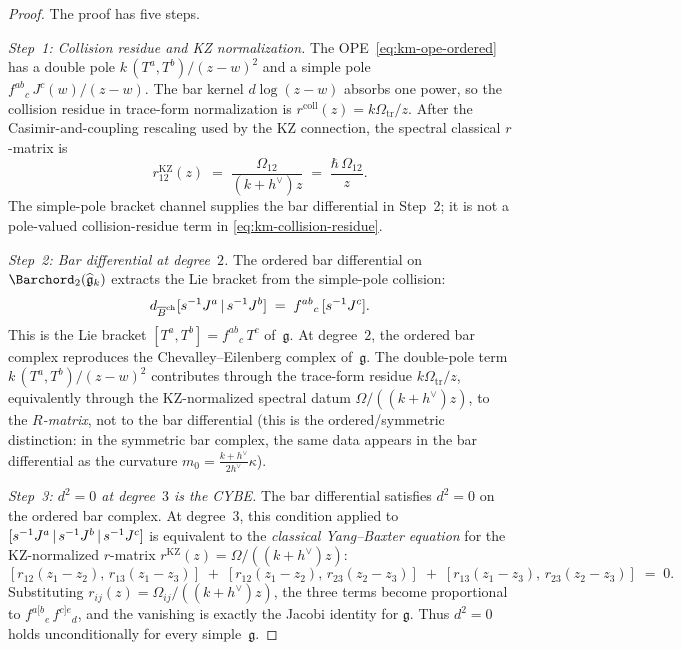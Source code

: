 \begin{proof}
The proof has five steps.

\emph{Step~1: Collision residue and KZ normalization.}
The OPE~\eqref{eq:km-ope-ordered} has a double pole
$k\,(T^a,T^b)/(z-w)^2$ and a simple pole
$f^{ab}{}_{c}\,J^c(w)/(z-w)$. The bar kernel
$d\log(z-w)$ absorbs one power, so the collision
residue in trace-form normalization is
$r^{\mathrm{coll}}(z)=k\Omega_{\mathrm{tr}}/z$. After the
Casimir-and-coupling rescaling used by the KZ connection, the spectral
classical $r$-matrix is
\begin{equation}\label{eq:km-collision-residue}
r^{\mathrm{KZ}}_{12}(z)
\;=\;
\frac{\Omega_{12}}{(k+h^\vee)z}
\;=\;
\frac{\hbar\,\Omega_{12}}{z}.
\end{equation}
The simple-pole bracket channel supplies the bar differential in
Step~2; it is not a pole-valued collision-residue term in
\eqref{eq:km-collision-residue}.

\emph{Step~2: Bar differential at degree~$2$.}
The ordered bar differential on
$\Barchord_2(\widehat{\mathfrak{g}}_k)$ extracts
the Lie bracket from the simple-pole collision:
\begin{equation}\label{eq:km-bar-d2}
d_{\overline{B}^{\mathrm{ch}}}[s^{-1}J^a \,|\, s^{-1}J^b]
\;=\;
f^{ab}{}_{c}\,[s^{-1}J^c].
\end{equation}
This is the Lie bracket $[T^a, T^b] = f^{ab}{}_{c}\,T^c$
of~$\mathfrak{g}$. At degree~$2$, the ordered bar complex
reproduces the Chevalley--Eilenberg complex
of~$\mathfrak{g}$. The double-pole term
$k\,(T^a,T^b)/(z-w)^2$ contributes through the trace-form residue
$k\Omega_{\mathrm{tr}}/z$, equivalently through the KZ-normalized
spectral datum $\Omega/((k+h^\vee)z)$, to the \emph{$R$-matrix}, not
to the bar differential (this is the ordered/symmetric
distinction: in the symmetric bar complex, the same data
appears in the bar differential as the curvature
$m_0 = \frac{k+h^\vee}{2h^\vee}\kappa$).

\emph{Step~3: $d^2=0$ at degree~$3$ is the CYBE.}
The bar differential satisfies $d^2 = 0$ on the ordered bar
complex. At degree~$3$, this condition applied to
$[s^{-1}J^a \,|\, s^{-1}J^b \,|\, s^{-1}J^c]$
is equivalent to the \emph{classical Yang--Baxter equation}
for the KZ-normalized $r$-matrix
$r^{\mathrm{KZ}}(z)=\Omega/((k+h^\vee)z)$:
\begin{equation}\label{eq:cybe}
[r_{12}(z_1{-}z_2),\, r_{13}(z_1{-}z_3)]
\;+\;
[r_{12}(z_1{-}z_2),\, r_{23}(z_2{-}z_3)]
\;+\;
[r_{13}(z_1{-}z_3),\, r_{23}(z_2{-}z_3)]
\;=\; 0.
\end{equation}
Substituting
$r_{ij}(z)=\Omega_{ij}/((k+h^\vee)z)$, the three
terms become proportional to $f^{a[b}{}_{e}\,f^{c]e}{}_{d}$,
and the vanishing is exactly the Jacobi identity for
$\mathfrak{g}$. Thus $d^2=0$ holds unconditionally for every
simple~$\mathfrak{g}$.


\end{proof}

